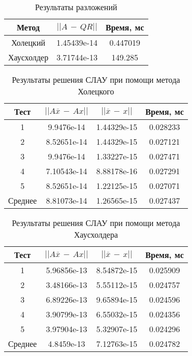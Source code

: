 \documentclass[a4paper,12pt,titlepage,finall]{article}
\begin{document}
\begin{table}[h]
\centering
\begin{tabular}{|c|c|c|}
\hline
Метод & $||A\,-\,QR||$ & Время, мс \\
\hline
Холецкий & 1.45439e-14 & 0.447019 \\
\hline
Хаусхолдер & 3.71744e-13 & 149.285 \\
\hline
\end{tabular}
\caption{Результаты разложений}
\label{table1}
\end{table}

\begin{table}[h]
\centering
\begin{tabular}{|c|c|c|c|}
\hline
Тест & $||A\overline{x}\,-\,Ax||$ & $||\overline{x}\,-\,x||$ & Время, мс \\
\hline
1 & 9.9476e-14 & 1.44329e-15 & 0.028233 \\
\hline
2 & 8.52651e-14 & 1.44329e-15 & 0.027121 \\
\hline
3 & 9.9476e-14 & 1.33227e-15 & 0.027471 \\
\hline
4 & 7.10543e-14 & 8.88178e-16 & 0.027291 \\
\hline
5 & 8.52651e-14 & 1.22125e-15 & 0.027071 \\
\hline
Среднее & 8.81073e-14 & 1.26565e-15 & 0.027437 \\
\hline
\end{tabular}
\caption{Результаты решения СЛАУ при помощи метода Холецкого}
\label{table1}
\end{table}

\begin{table}[h]
\centering
\begin{tabular}{|c|c|c|c|}
\hline
Тест & $||A\overline{x}\,-\,Ax||$ & $||\overline{x}\,-\,x||$ & Время, мс \\
\hline
1 & 5.96856e-13 & 8.54872e-15 & 0.025909 \\
\hline
2 & 3.48166e-13 & 5.55112e-15 & 0.024757 \\
\hline
3 & 6.89226e-13 & 9.65894e-15 & 0.024596 \\
\hline
4 & 3.90799e-13 & 6.55032e-15 & 0.024356 \\
\hline
5 & 3.97904e-13 & 5.32907e-15 & 0.024296 \\
\hline
Среднее & 4.8459e-13 & 7.12763e-15 & 0.024782 \\
\hline
\end{tabular}
\caption{Результаты решения СЛАУ при помощи метода Хаусхолдера}
\label{table1}
\end{table}
\end{document}
